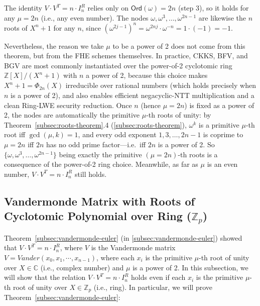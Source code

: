  The identity $V \cdot V^T = n \cdot I_n^R$ relies only on
$\textsf{Ord}(\omega) = 2n$ (step 3), so it holds for any $\mu = 2n$ (i.e., any even number).
The nodes $\omega, \omega^3, \ldots, \omega^{2n-1}$ are likewise the $n$ roots of $X^n + 1$
for any $n$, since $(\omega^{2j-1})^n = \omega^{2nj}\cdot\omega^{-n} = 1\cdot(-1) = -1$.

Nevertheless, the reason we take $\mu$ to be a power of 2 does not come from this theorem, but
from the FHE schemes themselves. In practice, CKKS, BFV, and BGV are most commonly instantiated
over the power-of-2 cyclotomic ring $\mathbb{Z}[X]/(X^n + 1)$ with $n$ a power of 2, because this choice makes $X^n + 1 = \Phi_{2n}(X)$ irreducible over rational numbers (which holds
precisely when $n$ is a power of 2), and also enables efficient negacyclic-NTT multiplication
and a clean Ring-LWE security reduction. Once
$n$ (hence $\mu = 2n$) is fixed as a power of 2, the nodes are automatically the primitive
$\mu$-th roots of unity: by Theorem~\ref*{subsec:roots-theorem}.4 (\autoref{subsec:roots-theorem}),
$\omega^k$ is a primitive $\mu$-th root iff $\gcd(\mu, k) = 1$, and every odd exponent
$1, 3, \ldots, 2n-1$ is coprime to $\mu = 2n$ iff $2n$ has no odd prime factor---i.e.\ iff $2n$
is a power of 2. So $\{\omega, \omega^3, \ldots, \omega^{2n-1}\}$ being exactly the primitive
$(\mu=2n)$-th roots is a consequence of the power-of-2 ring choice. Meanwhile, as far as $\mu$ is an even number, $V \cdot V^T = n \cdot I_n^R$ still holds.



\subsection{Vandermonde Matrix with Roots of Cyclotomic Polynomial over Ring ($\mathbb{Z}_p$)}
\label{subsec:vandermonde-euler-integer-ring}

Theorem~\ref*{subsec:vandermonde-euler} (in \autoref{subsec:vandermonde-euler}) showed that $V \cdot V^T = n \cdot I^R_n$, where $V$ is the Vandermonde matrix $V = \mathit{Vander}(x_0, x_1, \cdots, x_{n-1})$, where each $x_i$ is the primitive $\mu$-th root of unity over $X \in \mathbb{C}$ (i.e., complex number) and $\mu$ is a power of 2. In this subsection, we will show that the relation $V \cdot V^T = n \cdot I^R_n$ holds even if each $x_i$ is the primitive $\mu$-th root of unity over $X \in \mathbb{Z}_p$ (i.e., ring). In particular, we will prove Theorem~\ref*{subsec:vandermonde-euler}: 


